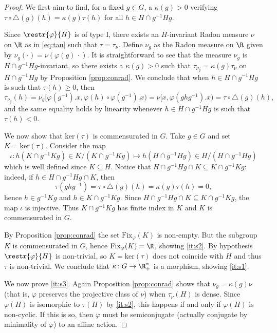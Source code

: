 \documentclass[reqno]{amsart}
\begin{document}
\begin{proof}
We first aim to find, for a fixed $g \in G$, a $\kappa(g)>0$ verifying $\tau \circ \triangle(g)(h) = \kappa(g)\tau(h)$ for all $h \in H \cap g^{-1}Hg$.

Since $\restr{\varphi}{H}$ is of type I, there exists an $H$-invariant Radon measure $\nu$ on $\R$ as in \eqref{eq:tau} such that $\tau = \tau_\nu$. Define $\nu_g$ as the Radon measure on $\R$ given by $\nu_g(\cdot) = \nu(\varphi(g)\,  \cdot)$. It is straightforward to see that the measure $\nu_g$ is $H \cap g^{-1}H g$-invariant, so there exists a $\kappa(g) > 0$ such that $\tau_{\nu_g} = \kappa(g)\tau_\nu$ on $H \cap g^{-1} H g$ by Proposition \ref{prop:conrad}. %
We conclude that when $h \in H \cap g^{-1}Hg$ is such that $\tau(h) \geq 0$, then
\[
        \tau_{\nu_g}(h) = \nu_g[\varphi(g^{-1}).x,\varphi(h)\circ \varphi(g^{-1}).x) = \nu[x, \varphi(ghg^{-1}).x) = \tau \circ \triangle(g)(h),
\]
and the same equality holds by linearity whenever $h \in H \cap g^{-1}Hg$ is such that $\tau(h) < 0$.

We now show that $\mathrm{ker}(\tau)$ is commensurated in $G$. Take $g \in G$ and set $K = \mathrm{ker}(\tau)$. Consider the map
\[
        \iota \colon h(K \cap g^{-1}Kg) \in K/(K \cap g^{-1}Kg) \mapsto h(H \cap g^{-1}Hg) \in H/(H \cap g^{-1}Hg)
\]
which is well defined since $K \subseteq H$. Notice that $H \cap g^{-1}H g \cap K \subseteq K\cap g^{-1}K g$: indeed, if $h \in H \cap g^{-1}Hg \cap K$, then
\[
        \tau(ghg^{-1}) = \tau \circ \triangle(g)(h) = \kappa(g) \tau(h) = 0,
\]
hence $h \in g^{-1}Kg$ and $h \in K \cap g^{-1}K g$. Since $H \cap g^{-1}H g \cap K \subseteq K \cap g^{-1}K g$,  the map $\iota$ is injective. Thus $K \cap g^{-1}Kg$ has finite index in $K$ and $K$ is commensurated in $G$.

By Proposition \ref{prop:conrad} the set $\mathrm{Fix}_\varphi(K)$ is non-empty. But the subgroup $K$ is commensurated in $G$, hence $\mathrm{Fix}_\varphi(K) = \R$, showing \eqref{it:s2}. By hypothesis $\restr{\varphi}{H}$ is non-trivial, so $K = \mathrm{ker}(\tau)$ does not coincide with $H$ and thus $\tau$ is non-trivial. We conclude that $\kappa \colon G \to \R^\ast_+$ is a morphism, showing \eqref{it:s1}.

We now prove \eqref{it:s3}. Again Proposition \ref{prop:conrad} shows that $\nu_g = \kappa(g)\nu$ (that is, $\varphi$ preserves the projective class of $\nu$) when $\tau_\nu(H)$ is dense. Since $\varphi(H)$ is isomorphic to $\tau(H)$ by \eqref{it:s2}, this happens if and only if $\varphi(H)$ is non-cyclic. If this is so, then $\varphi$ must be semiconjugate (actually conjugate by minimality of $\varphi$) to an affine action.


\end{proof}
\end{document}
